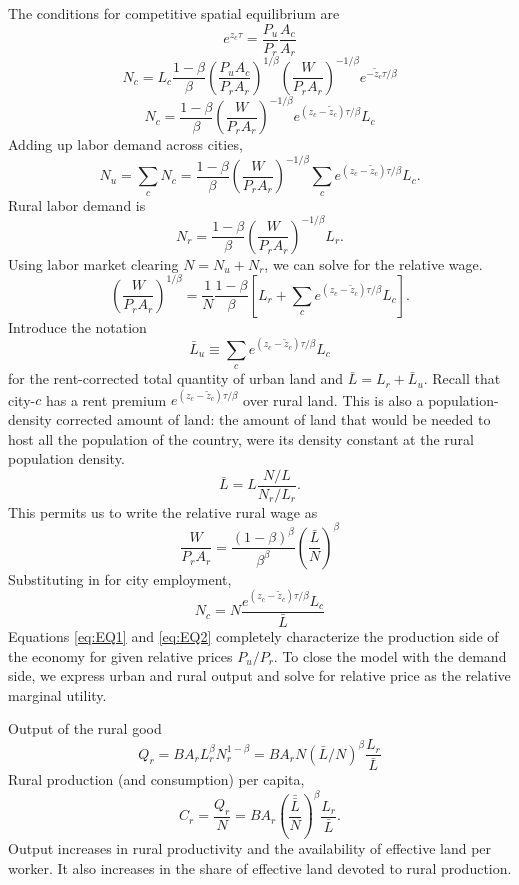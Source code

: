 \documentclass[12pt]{article}
\begin{document}
The conditions for competitive spatial equilibrium are
\begin{equation}\tag{i}\label{eq:EQ1}
e^{z_{c} \tau} =
\frac{P_u}{P_r}
\frac {A_c}{A_r}
\end{equation}
\[
	N_c = L_c
\frac{1-\beta}{\beta}
	 \left(\frac{P_uA_c}{P_rA_r}\right)^{1/\beta}
	 \left(\frac{W}{P_rA_r}\right)^{-1/\beta}
	 e^{-\tilde z_c{\tau/\beta}}
\]
\[
	N_c = 
\frac{1-\beta}{\beta}
	 \left(\frac{W}{P_rA_r}\right)^{-1/\beta}
	 e^{(z_c-\tilde z_c){\tau/\beta}}L_c
\]
Adding up labor demand across cities,
\[
N_u = \sum_c N_c
=
\frac{1-\beta}{\beta}
	 \left(\frac{W}{P_rA_r}\right)^{-1/\beta}
\sum_c e^{(z_c-\tilde z_c){\tau/\beta}}L_c.
\]
Rural labor demand is
\[
N_r =
\frac{1-\beta}{\beta}
	 \left(\frac{W}{P_rA_r}\right)^{-1/\beta}L_r.
\]
Using labor market clearing $N=N_u+N_r$, we can solve for the relative wage.
\[
\left(\frac{W}{P_rA_r}\right)^{1/\beta}
= \frac{1}{N}
	\frac{1-\beta}{\beta}
\left[
	L_r+
	\sum_c e^{(z_c-\tilde z_c){\tau/\beta}}L_c
\right].
\]
Introduce the notation
\[
\bar L_u \equiv 
	\sum_c e^{(z_c-\tilde z_c){\tau/\beta}}L_c
\]
for the rent-corrected total quantity of urban land and $\bar L = L_r + \bar L_u$. Recall that city-$c$ has a rent premium $e^{(z_c-\tilde z_c){\tau/\beta}}$ over rural land. This is also a population-density corrected amount of land: the amount of land that would be needed to host all the population of the country, were its density constant at the rural population density.
\[
\bar L = L
\frac{N/L}
	{N_r/L_r}.
\]
This permits us to write the relative rural wage as
\[
\frac{W}{P_rA_r}
=
	\frac{(1-\beta)^\beta}{\beta^\beta}
\left(
\frac {\bar L}{N}
\right)^{\beta}
\]
Substituting in for city employment,
\begin{equation}\tag{ii}\label{eq:EQ2}
	N_c =  N
\frac {e^{(z_c-\tilde z_c){\tau/\beta}}L_c}
	{{\bar L}}
\end{equation}
Equations \eqref{eq:EQ1} and \eqref{eq:EQ2} completely characterize the production side of the economy for given relative prices $P_u/P_r$. To close the model with the demand side, we express urban and rural output and solve for relative price as the relative marginal utility.

Output of the rural good
\[
Q_r = B A_r L_r^{\beta}N_r^{1-\beta}=
B A_r N ({\bar L}/N)^{\beta}
\frac {L_r}
	{{\bar L}}
\]
Rural production (and consumption) per capita,
\begin{equation}\label{eq:rural_per_capita}
C_r=\frac {Q_r}{N} =
B A_r \left(\frac{\bar{\bar L}}{N}\right)^{\beta}
\frac {L_r}
	{{\bar L}}
.
\end{equation}
Output increases in rural productivity and the availability of effective land per worker. It also increases in the share of effective land devoted to rural production.
\end{document}
